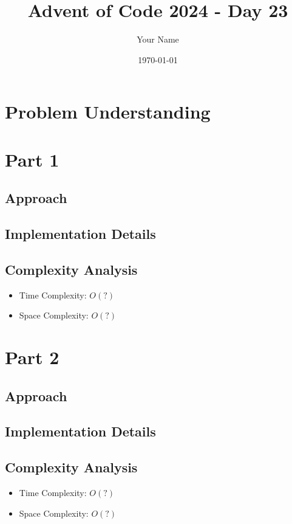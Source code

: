 \documentclass{article}
\title{Advent of Code 2024 - Day 23}
\author{Your Name}
\date{\today}
\begin{document}
\maketitle

\section{Problem Understanding}

\section{Part 1}
\subsection{Approach}

\subsection{Implementation Details}

\subsection{Complexity Analysis}
\begin{itemize}
    \item Time Complexity: $O(?)$
    \item Space Complexity: $O(?)$
\end{itemize}

\section{Part 2}
\subsection{Approach}

\subsection{Implementation Details}

\subsection{Complexity Analysis}
\begin{itemize}
    \item Time Complexity: $O(?)$
    \item Space Complexity: $O(?)$
\end{itemize}
\end{document}
